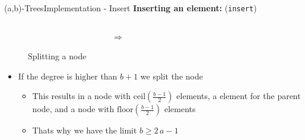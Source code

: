 \begin{frame}{(a,b)-Trees}{Implementation - Insert}
  \textbf{Inserting an element:} (\texttt{\color{Mittel-Blau}insert})
    \begin{figure}
    \begin{columns}
      \begin{column}{0.35\linewidth}
        \begin{adjustbox}{width=\linewidth}
          
        \end{adjustbox}
      \end{column}
      \begin{column}{0.1\linewidth}
        \begin{center}
          $\Rightarrow$
        \end{center}
      \end{column}
      \begin{column}{0.35\linewidth}
        \begin{adjustbox}{width=\linewidth}
          
        \end{adjustbox}
      \end{column}
    \end{columns}
    \caption{Splitting a node}
    \label{fig:a_b_tree:insert_node_split}
    \end{figure}
    \vspace{-1.0em}
  \begin{itemize}
    \item<2->
      If the degree is higher than {\color{Mittel-Blau}$b+1$}
      we split the node
    \begin{itemize}
      \item<3->
        This results in a node with
        {\color{Mittel-Blau}$\mathrm{ceil}\left(\frac{b-1}{2}\right)$} elements,
        a element for the parent node, and a node with
        {\color{Mittel-Blau}$\mathrm{floor}\left(\frac{b-1}{2}\right)$} elements
      \item<4->
        Thats why we have the limit {\color{Mittel-Blau}$b \geq 2\,a - 1$}
    \end{itemize}
  \end{itemize}
\end{frame}



